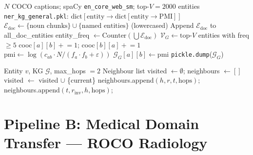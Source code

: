 \documentclass[12pt,a4paper]{article}
\theoremstyle{definition}
\theoremstyle{plain}
\theoremstyle{remark}
\newcommand{\KG}{\mathcal{G}}
\begin{document}
\begin{algorithm}[H]
\caption{Build General NER Knowledge Graph (PMI-Weighted)}
\label{alg:kg_build}
\begin{algorithmic}[1]
\Require $N$ COCO captions; spaCy \texttt{en\_core\_web\_sm}; top-$V = 2000$ entities
\Ensure \texttt{ner\_kg\_general.pkl}: $\text{dict}[\text{entity} \to \text{dict}[\text{entity} \to \text{PMI}]]$
  \State $\mathcal{E}_{\text{doc}} \gets \{\text{noun chunks}\} \cup \{\text{named entities}\}$ (lowercased)
  \State Append $\mathcal{E}_{\text{doc}}$ to all\_doc\_entities
\EndFor
\State entity\_freq $\gets \text{Counter}(\bigcup \mathcal{E}_{\text{doc}})$
\State $\mathcal{V}_G \gets \text{top-}V$ entities with freq $\ge 5$
    \State cooc$[a][b] \mathrel{+}= 1$; cooc$[b][a] \mathrel{+}= 1$
  \EndFor
\EndFor
{}
    \State $\text{pmi} \gets \log(c_{ab} \cdot N / (f_a \cdot f_b + \varepsilon))$
     $\KG_G[a][b] \gets \text{pmi}$ \EndIf
  \EndFor
\EndFor
\State \texttt{pickle.dump}($\KG_G$)
\end{algorithmic}
\end{algorithm}

\begin{algorithm}[H]
\caption{KG Depth-First Neighbour Search (max-2-hop)}
\label{alg:kgdfs}
\begin{algorithmic}[1]
\Require Entity $v$, KG $\KG$, max\_hops $= 2$
\Ensure Neighbour list
\State visited $\gets \emptyset$; neighbours $\gets []$
\State {}
   \Return \EndIf
  \State visited $\gets$ visited $\cup$ \{current\}
  \ForEach{$(h, r, t) \in \KG$.\text{relationships}}
     neighbours.append$(h, r, t, \text{hops})$;  \EndIf
     neighbours.append$(t, r_{\text{inv}}, h, \text{hops})$;  \EndIf
  \EndFor
\EndProcedure
\end{algorithmic}
\end{algorithm}

\newpage
\section{Pipeline B: Medical Domain Transfer — ROCO Radiology}
\label{sec:pipelineB}
\end{document}
